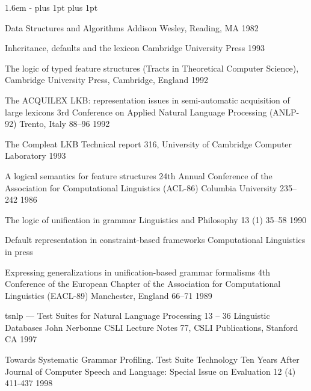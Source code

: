 \documentclass[12pt]{report}
\begin{document}
\begin{list}{}
   {\leftmargin 1.6em
    \itemindent -\leftmargin
    \itemsep 0pt plus 1pt
    \parsep 0pt plus 1pt}

{Data Structures and Algorithms}
{Addison Wesley, Reading, MA}
{1982}

{Inheritance, defaults and the lexicon}
{Cambridge University Press}
{1993}

{The logic of typed feature structures}
{(Tracts in Theoretical Computer Science), Cambridge University Press,
  Cambridge, England} 
{1992}


{The ACQUILEX LKB: representation issues in semi-automatic
acquisition of large lexicons}
{3rd Conference on Applied Natural Language Processing (ANLP-92)}
{Trento, Italy}
{88--96}
{1992}

{The Compleat LKB}
{Technical report 316,
University of Cambridge Computer Laboratory}
{1993}


{A logical semantics for feature structures}
{24th Annual Conference of the Association for Computational
Linguistics (ACL-86)}
{Columbia University}
{235--242}
{1986}

{The logic of unification in grammar}
{Linguistics and Philosophy}
{13 (1)}
{35--58}
{1990}

{Default representation in constraint-based frameworks}
{Computational Linguistics}
{in press}

  {Expressing generalizations in unification-based grammar formalisms}
  {4th Conference of the European Chapter of the Association 
for Computational Linguistics (EACL-89)}
  {Manchester, England}
  {66--71}
  {1989}

{{\sc tsnlp} --- {T}est {S}uites for {N}atural {L}anguage {P}rocessing}
{13 -- 36}
{Linguistic Databases}
{John Nerbonne}
{CSLI Lecture Notes 77, CSLI Publications, Stanford CA}
{1997}

{Towards Systematic Grammar Profiling.
               {T}est Suite Technology Ten Years After}
{Journal of Computer Speech and Language:
Special Issue on Evaluation}
{12 (4)}
{411-437}
{1998}


\end{list}
\end{document}
